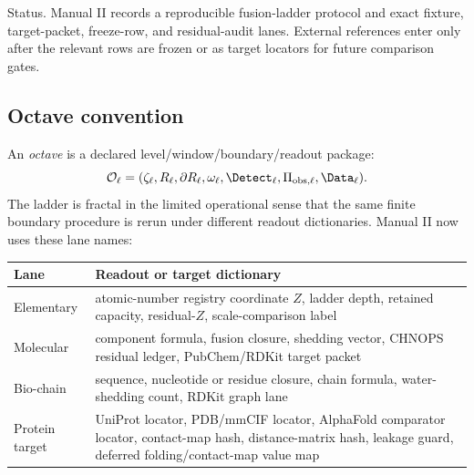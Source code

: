 Status. Manual II records a reproducible fusion-ladder protocol and exact fixture, target-packet, freeze-row, and residual-audit lanes. External references enter only after the relevant rows are frozen or as target locators for future comparison gates.


\subsection{Octave convention}

An \emph{octave} is a declared level/window/boundary/readout package:
\[
\mathcal O_\ell=(\zeta_\ell,R_\ell,\partial R_\ell,\omega_\ell,\Detect_\ell,\Pi_{\mathrm{obs},\ell},\Data_\ell).
\]
The ladder is fractal in the limited operational sense that the same finite boundary procedure is rerun under different readout dictionaries. Manual II now uses these lane names:
\begin{center}
\begin{tabularx}{\linewidth}{@{}lX@{}}
\toprule
Lane & Readout or target dictionary \\
\midrule
Elementary & atomic-number registry coordinate $Z$, ladder depth, retained capacity, residual-$Z$, scale-comparison label \\
Molecular & component formula, fusion closure, shedding vector, CHNOPS residual ledger, PubChem/RDKit target packet \\
Bio-chain & sequence, nucleotide or residue closure, chain formula, water-shedding count, RDKit graph lane \\
Protein target & UniProt locator, PDB/mmCIF locator, AlphaFold comparator locator, contact-map hash, distance-matrix hash, leakage guard, deferred folding/contact-map value map \\
\bottomrule
\end{tabularx}
\end{center}
